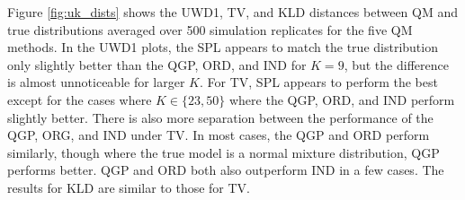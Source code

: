 \documentclass[preprint,12pt,authoryear]{elsarticle}
\begin{document}













Figure \ref{fig:uk_dists} shows the UWD1, TV, and KLD distances between QM and true distributions averaged over 500 simulation replicates for the five QM methods. In the UWD1 plots, the SPL appears to match the true distribution only slightly better than the QGP, ORD, and IND for $K = 9$, but the difference is almost unnoticeable for larger $K$. For TV, SPL appears to perform the best except for the cases where $K \in\{23, 50\}$ where the QGP, ORD, and IND perform slightly better. There is also more separation between the performance of the QGP, ORG, and IND under TV. In most cases, the QGP and ORD perform similarly, though where the true model is a normal mixture distribution, QGP performs better. QGP and ORD both also outperform IND in a few cases. The results for KLD are similar to those for TV.
\end{document}
